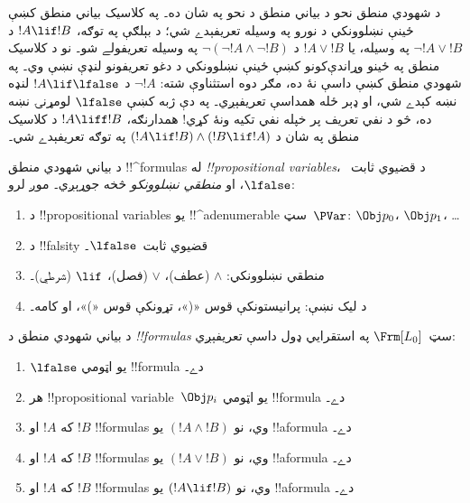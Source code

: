 \documentclass[../../../include/open-logic-section]{subfiles}
\begin{document}


د شهودي منطق نحو د بياني منطق د نحو په شان ده۔ په کلاسيک بياني
منطق کښې ځينې نښلوونکي د نورو په وسيله تعريفېدے شي؛ د بېلګې په توګه،
$!A \lif !B$ د $\lnot !A \lor !B$ په وسيله، يا $!A \lor !B$ د
$\lnot(\lnot !A \land \lnot !B)$ په وسيله تعريفولے شو۔ نو د کلاسيک
منطق په ځينو وړاندې‌کونو کښې ځينې نښلوونکي د دغو تعريفونو لنډې نښې
وي۔ په شهودي منطق کښې داسې نۀ ده، مګر دوه استثناوې شته: $\lnot !A$
د $!A \lif \lfalse$ لنډه نښه کېدے شي، او ډېر ځله همداسې تعريفېږي۔
په دې ژبه کښې $\lfalse$ لومړنۍ نښه ده، څو د نفي تعريف پر
خپله نفي تکيه ونۀ کړي!{} همدارنګه،
$!A \liff !B$ د کلاسيک منطق په شان د $(!A \lif !B) \land (!B \lif
!A)$ په توګه تعريفېدے شي۔

د بياني شهودي منطق !!^{formula}s له \emph{!!{propositional variable}s}،
د قضيوي ثابت~$\lfalse$، او \emph{منطقي نښلوونکو} څخه جوړېږي۔ موږ لرو:

\begin{enumerate}
\item د !!{propositional variable}s يو !!^a{denumerable} سټ~$\PVar$:
  $\Obj p_0$، $\Obj p_1$، \dots
  \item د !!{falsity} قضيوي ثابت~$\lfalse$۔
\item منطقي نښلوونکي: $\land$ (عطف)، $\lor$ (فصل)، $\lif$ (شرطي)۔
\item د ليک نښې: پرانيستونکې قوس «(»، تړونکې قوس «)»، او کامه۔
\end{enumerate}

\begin{defn}[فارمول]
 د بياني شهودي منطق د \emph{!!{formula}s}
سټ~$\Frm[L_0]$ په استقرايي ډول داسې تعريفېږي:
\begin{enumerate}
\item $\lfalse$ يو اټومي !!{formula} دے۔

\item هر !!{propositional variable}~$\Obj p_i$ يو اټومي
  !!{formula} دے۔

\item که $!A$ او $!B$ !!{formula}s وي، نو $(!A \land
  !B)$ يو !!a{formula} دے۔

\item که $!A$ او $!B$ !!{formula}s وي، نو $(!A \lor !B)$
  يو !!a{formula} دے۔

\item که $!A$ او $!B$ !!{formula}s وي، نو $(!A \lif !B)$
  يو !!a{formula} دے۔

\end{enumerate}
\end{defn}
\end{document}
